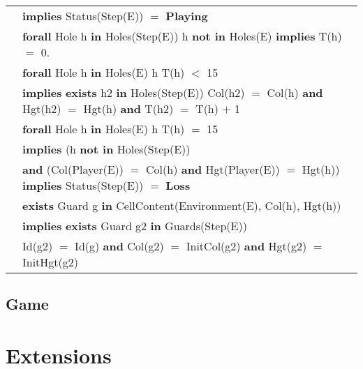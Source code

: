 \documentclass[8pt]{article}
\begin{document}
{\begin{longtable}{rl}
  & \quad\quad \textbf{implies} \textrm{Status(Step(E))} $=$ \textbf{Playing}\\
  & \textbf{forall} \textrm{Hole} h \textbf{in} \textrm{Holes(Step(E))} h \textbf{not in} \textrm{Holes(E)} \textbf{implies} \textrm{T(h)} $=$ 0.\\
  & \textbf{forall} \textrm{Hole} h \textbf{in} \textrm{Holes(E)} h \textrm{T(h)} $<$ 15\\
  & \quad\quad \textbf{implies} \textbf{exists} h2 \textbf{in} \textrm{Holes(Step(E))} \textrm{Col(h2)} $=$ \textrm{Col(h)} \textbf{and} \textrm{Hgt(h2)} $=$ \textrm{Hgt(h)} \textbf{and} \textrm{T(h2)} $=$ \textrm{T(h)} $+$ 1\\
  & \textbf{forall} \textrm{Hole} h \textbf{in} \textrm{Holes(E)} h \textrm{T(h)} $=$ 15\\
  & \quad\quad \textbf{implies} (h \textbf{not in} \textrm{Holes(Step(E))}\\
  & \quad\quad\quad\quad \textbf{and} (\textrm{Col(Player(E))} $=$ \textrm{Col(h)} \textbf{and} \textrm{Hgt(Player(E))} $=$ \textrm{Hgt(h)}) \textbf{implies} \textrm{Status(Step(E))} $=$ \textbf{Loss}\\
  & \quad\quad\quad\quad \textbf{exists} \textrm{Guard} g \textbf{in} \textrm{CellContent(Environment(E), Col(h), Hgt(h))}\\
  & \quad\quad\quad\quad\quad\quad \textbf{implies} \textbf{exists} \textrm{Guard} g2 \textbf{in} \textrm{Guards(Step(E))}\\
  & \quad\quad\quad\quad\quad\quad\quad \textrm{Id(g2)} $=$ \textrm{Id(g)} \textbf{and} \textrm{Col(g2)} $=$ \textrm{InitCol(g2)} \textbf{and} \textrm{Hgt(g2)} $=$ \textrm{InitHgt(g2)}\\
\end{longtable}}

\subsection{Game}

\section{Extensions}
\end{document}
